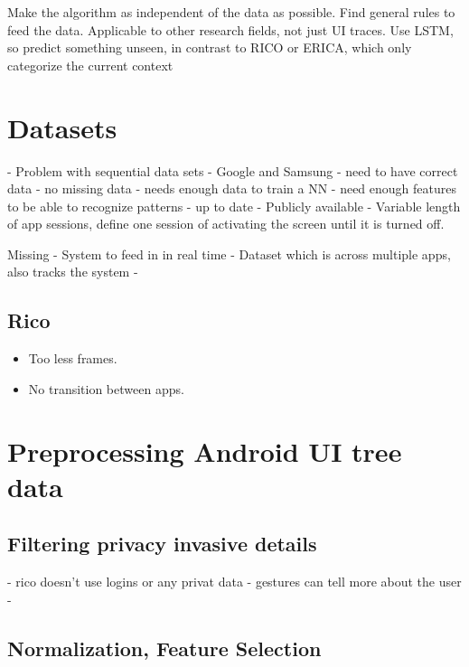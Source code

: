 Make the algorithm as independent of the data as possible.
Find general rules to feed the data.
Applicable to other research fields, not just UI traces.
Use LSTM, so predict something unseen, in contrast to RICO or ERICA, which only categorize the current context


\section{Datasets}

- Problem with sequential data sets
- Google and Samsung
- need to have correct data
- no missing data
- needs enough data to train a NN
- need enough features to be able to recognize patterns
- up to date
- Publicly available
- Variable length of app sessions, define one session of activating the screen until it is turned off.

Missing
- System to feed in in real time
- Dataset which is across multiple apps, also tracks the system
-

\subsection{Rico}

\begin{itemize}
  \item Too less frames.
  \item No transition between apps.
\end{itemize}

\section{Preprocessing Android UI tree data}
\subsection{Filtering privacy invasive details}

- rico doesn't use logins or any privat data
- gestures can tell more about the user
-


\subsection{Normalization, Feature Selection}

